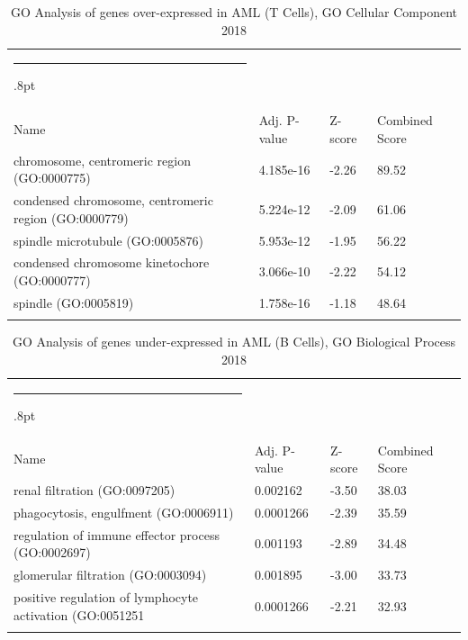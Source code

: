\documentclass[3p,authoryear,preprint,12pt]{elsarticle}
\makeatletter
\def\hlinewd#1{%
  \noalign{\ifnum0=`}\fi\hrule \@height #1%
  \futurelet\reserved@a\@xhline}
\def\tbltoprule{\hlinewd{.8pt}\\[-12pt]}
\def\tblbottomrule{\noalign{\vspace*{6pt}}\hline\noalign{\vspace*{2pt}}}
\def\tblmidrule{\noalign{\vspace*{6pt}}\hline\noalign{\vspace*{2pt}}}
\makeatother
\begin{document}
\begin{table}[!htbp]
	\caption{{GO Analysis of genes over-expressed in AML (T Cells), GO Cellular Component 2018} }
	\label{tw-de478ae31pc6}
	\def\arraystretch{1}
	\ignorespaces 
	\centering 
	\begin{tabulary}{\linewidth}{p{\dimexpr.65\tabcolsep}p{\dimexpr.15\tabcolsep}p{\dimexpr.1\tabcolsep}p{\dimexpr.1\tabcolsep}}
		\tbltoprule Name & Adj. P-value & Z-score & Combined Score\\
		\tblmidrule
chromosome, centromeric region (GO:0000775) & 4.185e-16 & -2.26 & 89.52 \\
condensed chromosome, centromeric region (GO:0000779) & 5.224e-12 & -2.09 & 61.06 \\
spindle microtubule (GO:0005876) & 5.953e-12 & -1.95 & 56.22 \\
condensed chromosome kinetochore (GO:0000777) & 3.066e-10 & -2.22 & 54.12 \\
spindle (GO:0005819) & 1.758e-16 & -1.18 & 48.64 \\
		\tblbottomrule
	\end{tabulary}\par 
\end{table}
\begin{table}[!htbp]
	\caption{{GO Analysis of genes under-expressed in AML (B Cells), GO Biological Process 2018} }
	\label{tw-de478ae31qc6}
	\def\arraystretch{1}
	\ignorespaces 
	\centering 
	\begin{tabulary}{\linewidth}{p{\dimexpr.65\tabcolsep}p{\dimexpr.15\tabcolsep}p{\dimexpr.1\tabcolsep}p{\dimexpr.1\tabcolsep}}
		\tbltoprule Name & Adj. P-value & Z-score & Combined Score\\
		\tblmidrule
renal filtration (GO:0097205) & 0.002162 & -3.50 & 38.03 \\
phagocytosis, engulfment (GO:0006911) & 0.0001266 & -2.39 & 35.59 \\
regulation of immune effector process (GO:0002697) & 0.001193 & -2.89 & 34.48 \\
glomerular filtration (GO:0003094) & 0.001895 & -3.00 & 33.73 \\
positive regulation of lymphocyte activation (GO:0051251 & 0.0001266 & -2.21 & 32.93 \\
		\tblbottomrule
	\end{tabulary}\par 
\end{table}
\end{document}
